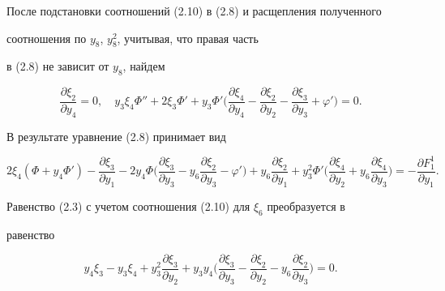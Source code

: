 После подстановки соотношений (2.10) в (2.8) и расщепления полученного 


соотношения по $y_8$, $y^2_8$, учитывая, что правая часть 


в (2.8) не зависит от $y_8$, найдем 


\begin{equation} 


\frac{\partial\xi_2}{\partial y_4}=0,\quad 


y_3\xi_4\Phi''+2\xi_3\Phi'+y_3\Phi'\bigg(


\frac{\partial\xi_4}{\partial y_4}- 


\frac{\partial\xi_2}{\partial y_2}- 


\frac{\partial\xi_3}{\partial y_3}+\varphi'\bigg)=0.\tag{2.11} 


\end{equation} 


В результате уравнение (2.8) принимает вид 


\begin{equation} 


2\xi_4(\Phi{+}y_4\Phi')- 


\frac{\partial\xi_3}{\partial y_1}{-}2y_4\Phi\bigg( 


\frac{\partial\xi_3}{\partial y_3}{-}y_6 


\frac{\partial\xi_2}{\partial y_3}{-}\varphi'\bigg){+} 


y_6\frac{\partial\xi_2}{\partial y_1}+y^2_3\Phi'\bigg( 


\frac{\partial\xi_4}{\partial y_2}+y_6 


\frac{\partial\xi_4}{\partial y_3}\bigg)= 


-\frac{\partial F^1_1}{\partial y_1}.\tag{2.12} 


\end{equation} 


 


Равенство (2.3) с учетом соотношения (2.10) для $\xi_6$ преобразуется в 


равенство 


\begin{equation} 


y_4\xi_3-y_3\xi_4+y^2_3 


\frac{\partial\xi_3}{\partial y_2}+y_3y_4\bigg( 


\frac{\partial\xi_3}{\partial y_3}- 


\frac{\partial\xi_2}{\partial y_2}-y_6 


\frac{\partial\xi_2}{\partial y_3}\bigg)=0.\tag{2.13} 


\end{equation} 


